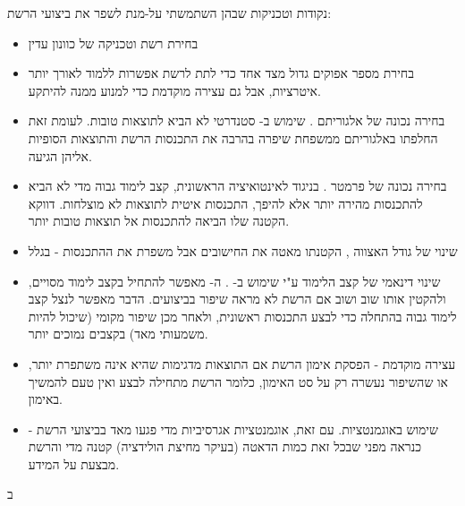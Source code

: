 נקודות וטכניקות שבהן השתמשתי על-מנת לשפר את ביצועי הרשת:

\begin{itemize}
    \item בחירת רשת וטכניקה של כוונון עדין
    \item בחירת מספר אפוקים גדול מצד אחד כדי לתת לרשת אפשרות ללמוד לאורך יותר איטרציות, אבל גם עצירה מוקדמת כדי למנוע ממנה להיתקע.
    \item בחירה נכונה של אלגוריתם . שימוש ב- סטנדרטי לא הביא לתוצאות טובות. לעומת זאת החלפתו באלגוריתם ממשפחת  שיפרה בהרבה את התכנסות הרשת והתוצאות הסופיות אליהן הגיעה.
    \item בחירה נכונה של פרמטר . בניגוד לאינטואיציה הראשונית, קצב לימוד גבוה מדי לא הביא להתכנסות מהירה יותר אלא להיפך, התכנסות איטית לתוצאות לא מוצלחות. דווקא הקטנה שלו הביאה להתכנסות אל תוצאות טובות יותר.
    \item שינוי של גודל האצווה , הקטנתו מאטה את החישובים אבל משפרת את ההתכנסות - בגלל
    \item שינוי דינאמי של קצב הלימוד ע"י שימוש ב- . ה- מאפשר להתחיל בקצב לימוד מסויים, ולהקטין אותו שוב ושוב אם הרשת לא מראה שיפור בביצועים. הדבר מאפשר לנצל קצב לימוד גבוה בהתחלה כדי לבצע התכנסות ראשונית, ולאחר מכן שיפור מקומי (שיכול להיות משמעותי מאד) בקצבים נמוכים יותר.
    \item עצירה מוקדמת  - הפסקת אימון הרשת אם התוצאות מדגימות שהיא אינה משתפרת יותר, או שהשיפור נעשרה רק על סט האימון, כלומר הרשת מתחילה לבצע  ואין טעם להמשיך באימון.
    \item שימוש באוגמנטציות. עם זאת, אוגמנטציות אגרסיביות מדי פגעו מאד בביצועי הרשת - כנראה מפני שבכל זאת כמות הדאטה (בעיקר מחיצת הולידציה) קטנה מדי והרשת מבצעת  על המידע.
\end{itemize}

ב

\lstset{
    basicstyle=\ttfamily\tiny, %
    keywordstyle=\bfseries, %
    showstringspaces=false,
    breaklines=true, %
    breakatwhitespace=true, %
    breakindent=0pt, %
    columns=fullflexible, %
    frame=single, %
    numbers=none, %
    xleftmargin=10pt,
    xrightmargin=10pt,
    aboveskip=5pt, %
    belowskip=5pt, %
}

